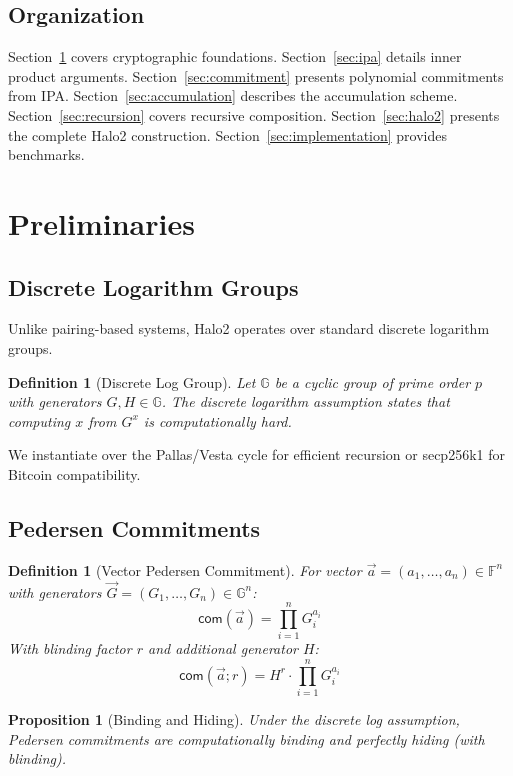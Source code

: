 \documentclass[11pt,a4paper]{article}
\newtheorem{definition}[theorem]{Definition}
\newtheorem{proposition}[theorem]{Proposition}
\newcommand{\F}{\mathbb{F}}
\newcommand{\G}{\mathbb{G}}
\newcommand{\com}{\mathsf{com}}
\begin{document}
\subsection{Organization}

Section~\ref{sec:preliminaries} covers cryptographic foundations. Section~\ref{sec:ipa} details inner product arguments. Section~\ref{sec:commitment} presents polynomial commitments from IPA. Section~\ref{sec:accumulation} describes the accumulation scheme. Section~\ref{sec:recursion} covers recursive composition. Section~\ref{sec:halo2} presents the complete Halo2 construction. Section~\ref{sec:implementation} provides benchmarks.

\section{Preliminaries}
\label{sec:preliminaries}

\subsection{Discrete Logarithm Groups}

Unlike pairing-based systems, Halo2 operates over standard discrete logarithm groups.

\begin{definition}[Discrete Log Group]
Let $\G$ be a cyclic group of prime order $p$ with generators $G, H \in \G$. The discrete logarithm assumption states that computing $x$ from $G^x$ is computationally hard.
\end{definition}

We instantiate over the Pallas/Vesta cycle for efficient recursion or secp256k1 for Bitcoin compatibility.

\subsection{Pedersen Commitments}

\begin{definition}[Vector Pedersen Commitment]
For vector $\vec{a} = (a_1, \ldots, a_n) \in \F^n$ with generators $\vec{G} = (G_1, \ldots, G_n) \in \G^n$:
\[
\com(\vec{a}) = \prod_{i=1}^n G_i^{a_i}
\]
With blinding factor $r$ and additional generator $H$:
\[
\com(\vec{a}; r) = H^r \cdot \prod_{i=1}^n G_i^{a_i}
\]
\end{definition}

\begin{proposition}[Binding and Hiding]
Under the discrete log assumption, Pedersen commitments are computationally binding and perfectly hiding (with blinding).
\end{proposition}
\end{document}
